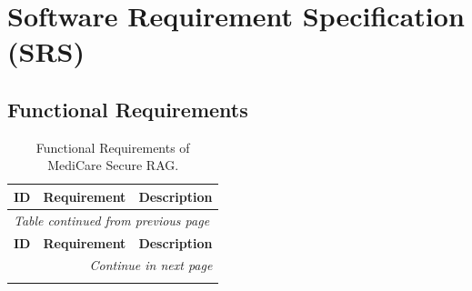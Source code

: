 \section{Software Requirement Specification (SRS)}

\subsection{Functional Requirements}

\setlength{\LTleft}{\fill}
\setlength{\LTright}{\fill}

\renewcommand{\arraystretch}{1.05} %

\begin{longtable}{|p{1.2cm}|p{3.8cm}|p{7.0cm}|}
\caption{Functional Requirements of MediCare Secure RAG.}
\label{tab:fr} \\
\hline
\rowcolor{gray!15}
\textbf{ID} & \textbf{Requirement} & \textbf{Description} \\
\hline
\endfirsthead

\multicolumn{3}{l}{\small\textit{Table \thetable{} continued from previous page}} \\[2pt]
\hline
\rowcolor{gray!15}
\textbf{ID} & \textbf{Requirement} & \textbf{Description} \\
\hline
\endhead

\hline
\multicolumn{3}{r}{\small\textit{Continue in next page}} \\  %
\endfoot

\hline
\endlastfoot


\end{longtable}
